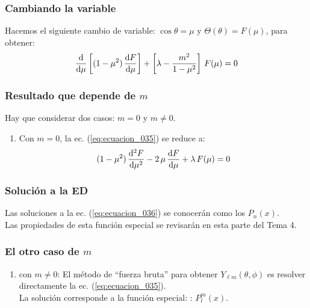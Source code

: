 \documentclass[12pt]{beamer}
\begin{document}
\begin{frame}
\frametitle{Cambiando la variable}
Hacemos el siguiente cambio de variable: $\cos \theta = \mu$ y $\Theta(\theta) = F(\mu)$, para obtener:
\pause
\begin{align}
\dv{\mu} \left[ (1 - \mu^{2}) \, \dv{F}{\mu} \right] + \left[ \lambda - \dfrac{m^{2}}{1 - \mu^{2}} \right] \, F(\mu) = 0
\label{eq:ecuacion_035}
\end{align}
\end{frame}
\begin{frame}
\frametitle{Resultado que depende de $m$}
Hay que considerar dos casos: $m = 0$ y $m \neq 0$.
\pause
{}
\begin{enumerate}[<+->]
\item Con $m = 0$, la ec. (\ref{eq:ecuacion_035}) se reduce a:
\pause
\begin{align}
(1 - \mu^{2}) \, \dv[2]{F}{\mu} - 2  \, \mu \, \dv{F}{\mu} + \lambda \, F(\mu) = 0
\label{eq:ecuacion_036}
\end{align}
\seti
\end{enumerate}
\end{frame}
\begin{frame}
\frametitle{Solución a la ED}
Las soluciones a la ec. (\ref{eq:ecuacion_036}) se conocerán como los \textbf{} $P_{n} (x)$.
\\
\bigskip
\pause
Las propiedades de esta función especial se revisarán en esta parte del Tema 4.
\end{frame}
\begin{frame}
\frametitle{El otro caso de $m$}
\begin{enumerate}[<+->]
\conti
\item con $m \neq 0$: \pause El método de \enquote{fuerza bruta} para obtener $Y_{\ell m} (\theta, \phi)$ es resolver directamente la ec. (\ref{eq:ecuacion_035}).
\\
\bigskip
\pause
La solución corresponde a la función especial: \textbf{}: $P_{l}^{m} (x)$.
\end{enumerate}
\end{frame}
\end{document}
